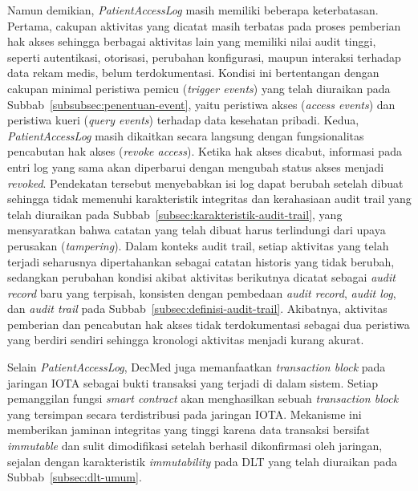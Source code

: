 Namun demikian, \textit{PatientAccessLog} masih memiliki beberapa keterbatasan. Pertama, cakupan aktivitas yang dicatat masih terbatas pada proses pemberian hak akses sehingga berbagai aktivitas lain yang memiliki nilai audit tinggi, seperti autentikasi, otorisasi, perubahan konfigurasi, maupun interaksi terhadap data rekam medis, belum terdokumentasi. Kondisi ini bertentangan dengan cakupan minimal peristiwa pemicu (\textit{trigger events}) yang telah diuraikan pada Subbab~\ref{subsubsec:penentuan-event}, yaitu peristiwa akses (\textit{access events}) dan peristiwa kueri (\textit{query events}) terhadap data kesehatan pribadi. Kedua, \textit{PatientAccessLog} masih dikaitkan secara langsung dengan fungsionalitas pencabutan hak akses (\textit{revoke access}). Ketika hak akses dicabut, informasi pada entri log yang sama akan diperbarui dengan mengubah status akses menjadi \textit{revoked}. Pendekatan tersebut menyebabkan isi log dapat berubah setelah dibuat sehingga tidak memenuhi karakteristik integritas dan kerahasiaan audit trail yang telah diuraikan pada Subbab~\ref{subsec:karakteristik-audit-trail}, yang mensyaratkan bahwa catatan yang telah dibuat harus terlindungi dari upaya perusakan (\textit{tampering}). Dalam konteks audit trail, setiap aktivitas yang telah terjadi seharusnya dipertahankan sebagai catatan historis yang tidak berubah, sedangkan perubahan kondisi akibat aktivitas berikutnya dicatat sebagai \textit{audit record} baru yang terpisah, konsisten dengan pembedaan \textit{audit record}, \textit{audit log}, dan \textit{audit trail} pada Subbab~\ref{subsec:definisi-audit-trail}. Akibatnya, aktivitas pemberian dan pencabutan hak akses tidak terdokumentasi sebagai dua peristiwa yang berdiri sendiri sehingga kronologi aktivitas menjadi kurang akurat.

Selain \textit{PatientAccessLog}, DecMed juga memanfaatkan \textit{transaction block} pada jaringan IOTA sebagai bukti transaksi yang terjadi di dalam sistem. Setiap pemanggilan fungsi \textit{smart contract} akan menghasilkan sebuah \textit{transaction block} yang tersimpan secara terdistribusi pada jaringan IOTA. Mekanisme ini memberikan jaminan integritas yang tinggi karena data transaksi bersifat \textit{immutable} dan sulit dimodifikasi setelah berhasil dikonfirmasi oleh jaringan, sejalan dengan karakteristik \textit{immutability} pada DLT yang telah diuraikan pada Subbab~\ref{subsec:dlt-umum}.

